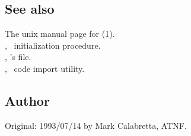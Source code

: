 \subsection*{See also}

The unix manual page for (1).\\
, \aipspp\ initialization procedure.\\
, 's  file.\\
, \aipspp\ code import utility.

\subsection*{Author}

Original: 1993/07/14 by Mark Calabretta, ATNF.
